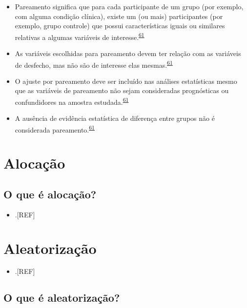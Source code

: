 \documentclass[
]{book}
\providecommand{\tightlist}{%
  \setlength{\itemsep}{0pt}\setlength{\parskip}{0pt}}
\begin{document}
\begin{itemize}
\item
  Pareamento significa que para cada participante de um grupo (por exemplo, com alguma condição clínica), existe um (ou mais) participantes (por exemplo, grupo controle) que possui características iguais ou similares relativas a algumas variáveis de interesse.\textsuperscript{\protect\hyperlink{ref-Bland1994}{61}}
\item
  As variáveis escolhidas para pareamento devem ter relação com as variáveis de desfecho, mas não são de interesse elas mesmas.\textsuperscript{\protect\hyperlink{ref-Bland1994}{61}}
\item
  O ajuste por pareamento deve ser incluído nas análises estatísticas mesmo que as variáveis de pareamento não sejam consideradas prognósticas ou confundidores na amostra estudada.\textsuperscript{\protect\hyperlink{ref-Bland1994}{61}}
\item
  A ausência de evidência estatística de diferença entre grupos não é considerada pareamento.\textsuperscript{\protect\hyperlink{ref-Bland1994}{61}}
\end{itemize}

\hypertarget{alocacao}{%
\section{Alocação}\label{alocacao}}

\hypertarget{o-que-uxe9-alocauxe7uxe3o}{%
\subsection{O que é alocação?}\label{o-que-uxe9-alocauxe7uxe3o}}

\begin{itemize}
\tightlist
\item
  .{[}REF{]}
\end{itemize}

\hypertarget{aleatorizauxe7uxe3o}{%
\section{Aleatorização}\label{aleatorizauxe7uxe3o}}

\begin{itemize}
\tightlist
\item
  .{[}REF{]}
\end{itemize}

\hypertarget{o-que-uxe9-aleatorizauxe7uxe3o}{%
\subsection{O que é aleatorização?}\label{o-que-uxe9-aleatorizauxe7uxe3o}}
\end{document}
